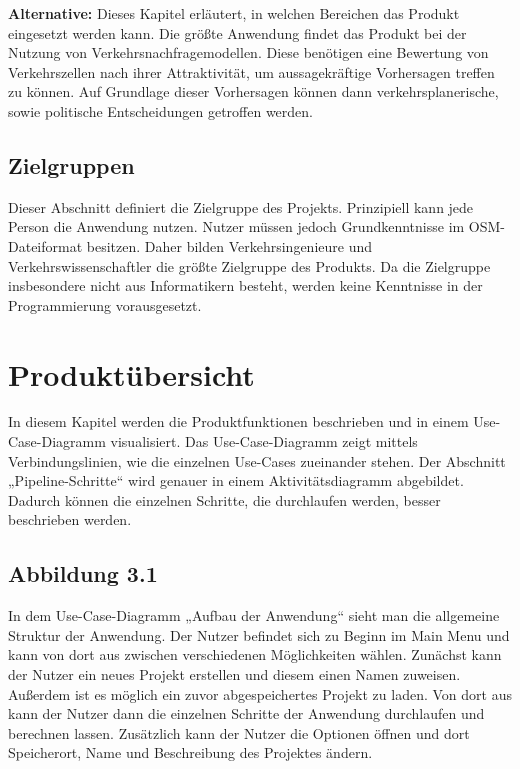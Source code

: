 \documentclass[parskip=full]{scrartcl} %
\begin{document}
\textbf{Alternative:}
Dieses Kapitel erläutert, in welchen Bereichen das Produkt eingesetzt werden kann. Die größte Anwendung findet das Produkt bei der Nutzung von Verkehrsnachfragemodellen. Diese benötigen eine Bewertung von Verkehrszellen nach ihrer Attraktivität, um aussagekräftige Vorhersagen treffen zu können. Auf Grundlage dieser Vorhersagen können dann verkehrsplanerische, sowie politische Entscheidungen getroffen werden.


\subsection{Zielgruppen}
Dieser Abschnitt definiert die Zielgruppe des Projekts. Prinzipiell kann jede Person die Anwendung nutzen. Nutzer müssen jedoch Grundkenntnisse im OSM-Dateiformat besitzen. Daher bilden Verkehrsingenieure und Verkehrswissenschaftler die größte Zielgruppe des Produkts. Da die Zielgruppe insbesondere nicht aus Informatikern besteht, werden keine Kenntnisse in der Programmierung vorausgesetzt.
\newpage







\section{Produktübersicht}
In diesem Kapitel werden die Produktfunktionen beschrieben und in einem Use-Case-Diagramm visualisiert. Das Use-Case-Diagramm zeigt mittels Verbindungslinien, wie die einzelnen Use-Cases zueinander stehen. Der Abschnitt „Pipeline-Schritte“ wird genauer in einem Aktivitätsdiagramm abgebildet. Dadurch können die einzelnen Schritte, die durchlaufen werden, besser beschrieben werden.

\subsection{Abbildung 3.1}
In dem Use-Case-Diagramm „Aufbau der Anwendung“ sieht man die allgemeine Struktur der Anwendung. Der Nutzer befindet sich zu Beginn im Main Menu und kann von dort aus zwischen verschiedenen Möglichkeiten wählen.
Zunächst kann der Nutzer ein neues Projekt erstellen und diesem einen Namen zuweisen. Außerdem ist es möglich ein zuvor abgespeichertes Projekt zu laden. Von dort aus kann der Nutzer dann die einzelnen Schritte der Anwendung durchlaufen und berechnen lassen. 
Zusätzlich kann der Nutzer die Optionen öffnen und dort Speicherort, Name und Beschreibung des Projektes ändern.
\end{document}
